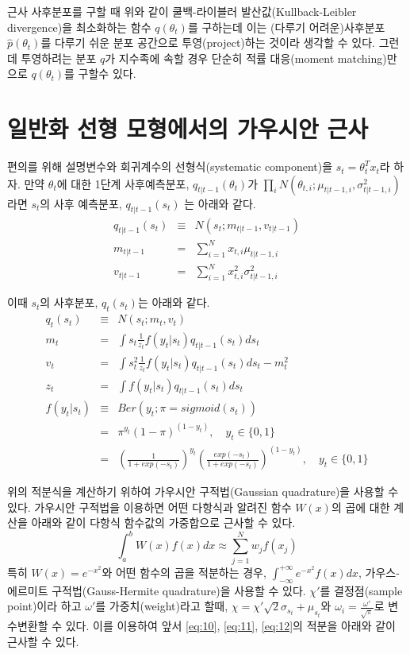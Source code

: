 \documentclass[oneside,b5paper,11pt]{book} %
\begin{document}
근사 사후분포를 구할 때 위와 같이 쿨백-라이블러 발산값(Kullback-Leibler divergence)을 최소화하는 함수 $q(\theta_t)$를 구하는데 이는 (다루기 어려운)사후분포$\hat{p}(\theta_t)$를 다루기 쉬운 분포 공간으로 투영(project)하는 것이라 생각할 수 있다. 그런데 투영하려는 분포 $q$가 지수족에 속할 경우 단순히 적률 대응(moment matching)만으로 $q(\theta_t)$를 구할수 있다.\citep{Murphy2012}


\section{일반화 선형 모형에서의 가우시안 근사}
편의를 위해 설명변수와 회귀계수의 선형식(systematic component)을 $s_t=\theta_t^T x_t$라 하자. 만약 $\theta_t$에 대한 1단계 사후예측분포, $q_{t|t-1}(\theta_t)$가 \newline 
$\prod_i N(\theta_{t,i};\mu_{t|t-1,i},\sigma^2_{t|t-1,i})$라면 $s_t$의 사후 예측분포, $q_{t|t-1}(s_t)$ 는 아래와 같다.
\begin{eqnarray}
   q_{t|t-1}(s_{t}) &\equiv& N(s_t;m_{t|t-1}, {v}_{t|t-1})
\\ m_{t|t-1} &=& \sum^N_{i=1}x_{t,i}\mu_{t|t-1,i}
\\ {v}_{t|t-1} &=& \sum^N_{i=1}x^2_{t,i}{\sigma}^2_{t|t-1,i}
\end{eqnarray}

이때 $s_t$의 사후분포, $q_t(s_t)$는 아래와 같다.
\begin{eqnarray}
q_t(s_t) &\equiv& N(s_t; m_t, v_t)
\\ m_t &=& \int s_t \frac{1}{z_t} f(y_t|s_t) q_{t|t-1}(s_t)ds_t \label{eq:10}
\\ v_t &=& \int s^2_t \frac{1}{z_t} f(y_t|s_t) q_{t|t-1}(s_t) ds_t - m_t^2 \label{eq:11}
\\ z_t &=& \int f(y_t|s_t) q_{t|t-1}(s_t)ds_t \label{eq:12}
\\ f(y_t|s_t) &\equiv& Ber(y_t;\pi = sigmoid(s_t))
\\ & =& \pi^{y_t} (1-\pi)^{(1-y_t)}, \quad y_t \in \{0,1\}
\\ & =& \left(\frac{1}{1+exp(-s_t)}\right)^{y_t} \left(\frac{exp(-s_t)}{1+exp(-s_t)}\right)^{(1-y_t)}, \quad y_t \in \{0,1\} \nonumber
\end{eqnarray}

위의 적분식을 계산하기 위하여 가우시안 구적법(Gaussian quadrature)을 사용할 수 있다. 가우시안 구적법을 이용하면 어떤 다항식과 알려진 함수 $W(x)$의 곱에 대한 계산을 아래와 같이 다항식 함수값의 가중합으로 근사할 수 있다.
$$\int^b_a W(x)f(x)dx \approx \sum^N_{j=1}w_j f(x_j)$$
특히 $W(x)=e^{-x^2}$와 어떤 함수의 곱을 적분하는 경우, $\int^{+\infty}_{-\infty}e^{-x^2}f(x)dx$, 가우스-에르미트 구적법(Gauss-Hermite quadrature)을 사용할 수 있다. $\chi'$를 결정점(sample point)이라 하고 $\omega'$를 가중치(weight)라고 할때,  $\chi=\chi'\sqrt{2}\sigma_{s_t}+\mu_{s_t}$와 $\omega_i = \frac{\omega'}{\sqrt{\pi}}$로 변수변환할 수 있다. 이를 이용하여 앞서 \ref{eq:10}, \ref{eq:11}, \ref{eq:12}의 적분을 아래와 같이 근사할 수 있다.\citep{Zoeter2007}
\end{document}
